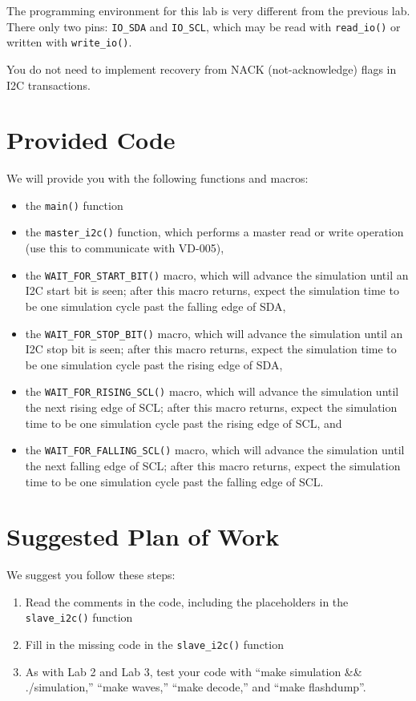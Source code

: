 \documentclass{article}
\begin{document}
The programming environment for this lab is very different from the
previous lab.  There only two pins: \texttt{IO\_SDA} and \texttt{IO\_SCL}, which
may be read with \texttt{read\_io()} or written with \texttt{write\_io()}.

You do not need to implement recovery from NACK (not-acknowledge) flags in
I2C transactions.

\section{Provided Code}

We will provide you with the following functions and macros:
\begin{itemize}
\item the \texttt{main()} function
\item the \texttt{master\_i2c()} function, which performs a master read or write operation (use this to
communicate with VD-005),
\item the \texttt{WAIT\_FOR\_START\_BIT()} macro, which will advance the simulation until an I2C start bit
is seen; after this macro returns, expect the simulation time to be one simulation cycle past the falling edge
of SDA,
\item the \texttt{WAIT\_FOR\_STOP\_BIT()} macro, which will advance the simulation until an I2C stop bit
is seen; after this macro returns, expect the simulation time to be one simulation cycle past the rising edge
of SDA,
\item the \texttt{WAIT\_FOR\_RISING\_SCL()} macro, which will advance the simulation until the next rising
edge of SCL; after this macro returns, expect the simulation time to be one simulation cycle past the rising edge
of SCL, and
\item the \texttt{WAIT\_FOR\_FALLING\_SCL()} macro, which will advance the simulation until the next falling
edge of SCL; after this macro returns, expect the simulation time to be one simulation cycle past the falling edge
of SCL.
\end{itemize}

\section{Suggested Plan of Work}

We suggest you follow these steps:
\begin{enumerate}
	\item Read the comments in the code, including the placeholders in the \texttt{slave\_i2c()} function
	\item Fill in the missing code in the \texttt{slave\_i2c()} function
	\item As with Lab 2 and Lab 3, test your code with ``make simulation \&\& ./simulation,''  ``make waves,''
		``make decode,'' and ``make flashdump''.
\end{enumerate}
\end{document}
